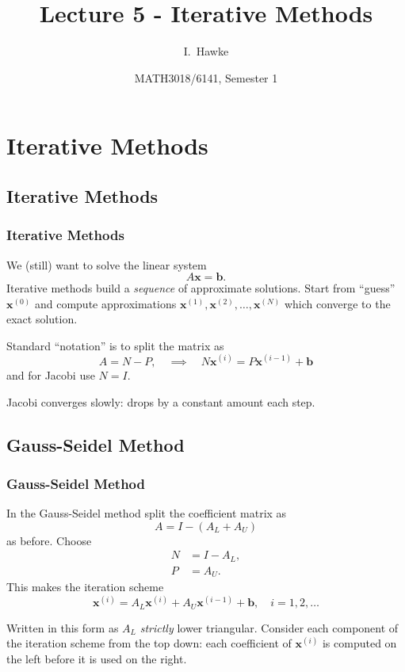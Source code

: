 \documentclass{beamer}
\title[Lecture 5] %
{Lecture 5 - Iterative Methods}
\author[I. Hawke]{I.~Hawke}
\institute[University of Southampton]%
{
  School of Mathematics, \\
  University of Southampton, UK
}
\date[Semester 1]{MATH3018/6141, Semester 1}
\newcommand{\bb}{{\boldsymbol{b}}}
\newcommand{\bx}{{\boldsymbol{x}}}
\begin{document}
\begin{frame}
  \titlepage
\end{frame}

\section{Iterative Methods}

\subsection{Iterative Methods}

\begin{frame}
  \frametitle{Iterative Methods}

   We (still) want to solve the linear system
   \begin{equation*}
     A \bx = \bb.
   \end{equation*}
   Iterative methods build a \emph{sequence} of approximate
   solutions. Start from ``guess'' $\bx^{(0)}$ and compute
   approximations $\bx^{(1)}, \bx^{(2)}, \dots, \bx^{(N)}$ which
   converge to the exact solution. \pause

   \vspace{1ex}

   Standard ``notation'' is to split the matrix as
   \begin{equation*}
     A = N - P, \quad \implies \quad N \bx^{(i)} = P \bx^{(i - 1)} + \bb
   \end{equation*}
   and for Jacobi use $N=I$. \pause

   \vspace{1ex}

   Jacobi converges slowly: drops by a constant amount each step.

\end{frame}

\subsection{Gauss-Seidel Method}

\begin{frame}
  \frametitle{Gauss-Seidel Method}

  In the Gauss-Seidel method split the coefficient matrix as
  \begin{equation*}
    A = I - (A_L + A_U)
  \end{equation*}
  as before. Choose
  \begin{align*}
    N & = I - A_L, \\
    P & = A_U.
  \end{align*}
  This makes the iteration scheme
  \begin{equation*}
    \bx^{(i)} =  A_L \bx^{(i)} + A_U \bx^{(i - 1)} + \bb, \quad i = 1,
    2, \dots
  \end{equation*} \pause

  Written in this form as $A_L$ \emph{strictly} lower
  triangular. Consider each component of the iteration scheme from the
  top down: each coefficient of $\bx^{(i)}$ is computed on the left
  before it is used on the right.

\end{frame}
\end{document}
